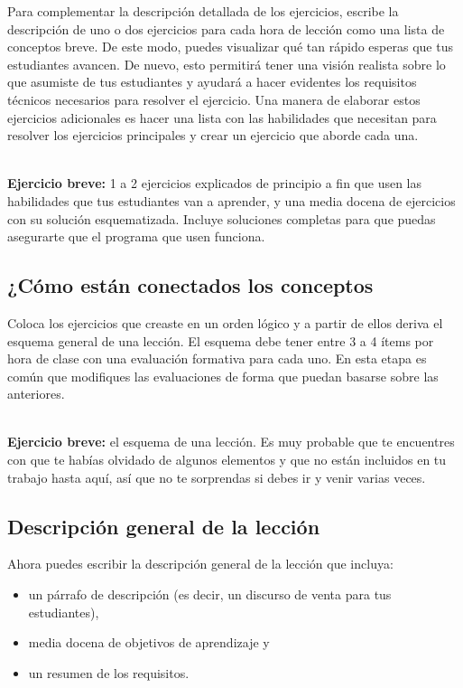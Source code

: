 Para complementar la descripción detallada de los ejercicios,
escribe la descripción de uno o dos ejercicios para cada hora de lección como una lista de conceptos breve. De este modo,
puedes visualizar qué tan rápido esperas que tus estudiantes avancen.
De nuevo, 
esto permitirá tener una visión realista sobre lo que asumiste de tus estudiantes
y ayudará a hacer evidentes los requisitos técnicos necesarios para resolver el ejercicio.
Una manera de elaborar estos ejercicios adicionales
es hacer una lista con las habilidades que necesitan para resolver los ejercicios principales
y crear un ejercicio que aborde cada una.

~\\
\noindent
\textbf{Ejercicio breve:} 1 a 2 ejercicios explicados de principio a fin
que usen las habilidades que tus estudiantes van a aprender,
y una media docena de ejercicios con su solución esquematizada.
Incluye soluciones completas
para que puedas asegurarte que el programa que usen funciona.

\subsection*{¿Cómo están conectados los conceptos}

Coloca los ejercicios que creaste en un orden lógico
y a partir de ellos deriva el esquema general de una lección.
El esquema debe tener entre 3 a 4 ítems por hora de clase
con una evaluación formativa para cada uno.
En esta etapa es común que modifiques las evaluaciones
de forma que puedan basarse sobre las anteriores.

~\\
\noindent
\textbf{Ejercicio breve:} el esquema de una lección.
Es muy probable que te encuentres con que te habías olvidado de algunos elementos y que no están incluidos en tu trabajo hasta aquí,
así que no te sorprendas si debes ir y venir varias veces.

\subsection*{Descripción general de la lección}

Ahora puedes escribir la descripción general de la lección que incluya:

\begin{itemize}

\item
  un párrafo de descripción (es decir, un discurso de venta para tus estudiantes),

\item
  media docena de objetivos de aprendizaje y

\item
  un resumen de los requisitos.

\end{itemize}

